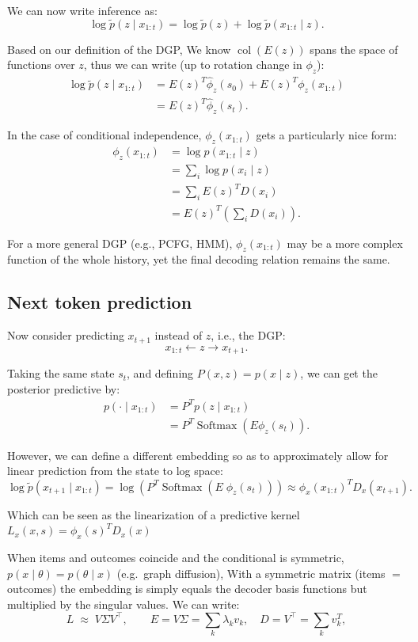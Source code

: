 \documentclass[11pt]{article}
\DeclareMathOperator{\Softmax}{Softmax}
\DeclareMathOperator{\col}{col}
\begin{document}
{We can now write inference as:
\[
\log\tilde p(z\mid x_{1:t})
=\log\tilde p(z)+\log\tilde p(x_{1:t}\mid z).
\]

Based on our definition of the DGP, We know $\col(E(z))$ spans the space of functions over $z$, thus we can write (up to rotation change in $\phi_z$):
\begin{align*}
\log\tilde p(z\mid x_{1:t})
&=E(z)^T\hat\phi_z(s_0)
  +E(z)^T\phi_z(x_{1:t})\\
&=E(z)^T\hat\phi_z(s_t).
\end{align*}

In the case of conditional independence, $\phi_z(x_{1:t})$ gets a particularly nice form:
\begin{align*}
\phi_z(x_{1:t})
&=\log p(x_{1:t}\mid z)\\
&=\sum_i\log p(x_i\mid z)\\
&=\sum_i E(z)^T D(x_i)\\
&=E(z)^T\left(\sum_iD(x_i)\right).
\end{align*}

For a more general DGP (e.g., PCFG, HMM), $\phi_z(x_{1:t})$ may be a more complex function of the whole history, yet the final decoding relation remains the same.

\subsection{Next token prediction}

Now consider predicting $x_{t+1}$ instead of $z$, i.e., the DGP:
\[
x_{1:t}\longleftarrow z\longrightarrow x_{t+1}.
\]

Taking the same state $s_t$, and defining $P(x,z)=p(x\mid z)$, we can get the posterior predictive by:
\begin{align*}
p(\cdot\mid x_{1:t})
&=P^T p(z\mid x_{1:t})\\
&=P^T\Softmax\!\left(E\phi_z(s_t)\right).
\end{align*}

However, we can define a different embedding so as to approximately allow for linear prediction from the state to log space:
\[
\log\tilde p(x_{t+1}\mid x_{1:t})
=\log (P^T\Softmax (E\; \phi_z(s_t)))\approx\phi_x(x_{1:t})^T D_x(x_{t+1}).
\]

Which can be seen as the linearization of a predictive kernel $L_x(x, s) = \phi_x(s)^T D_x(x)$



When items and outcomes coincide and the conditional is symmetric,
$p(x\mid\theta)=p(\theta\mid x)$ (e.g.\ graph diffusion), With a symmetric matrix (items $=$ outcomes) the embedding is simply equals the decoder basis functions but multiplied by the singular values. We can write: 
\begin{equation}
  L \;\approx\; V\Sigma V^\top,
  \qquad E = V\Sigma = \sum_k \lambda_k v_k,\quad D = V^\top = \sum_k v_k^T,
\end{equation}

}
\end{document}
